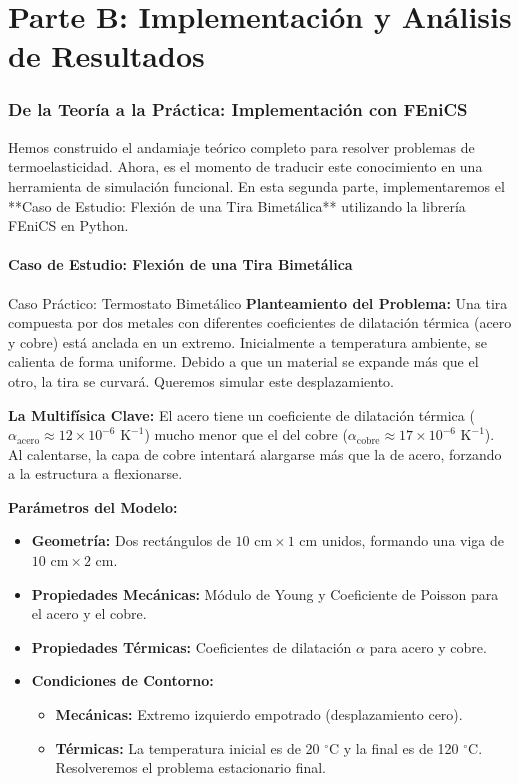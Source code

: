\part*{Parte B: Implementación y Análisis de Resultados}

\section{De la Teoría a la Práctica: Implementación con FEniCS}
Hemos construido el andamiaje teórico completo para resolver problemas de termoelasticidad. Ahora, es el momento de traducir este conocimiento en una herramienta de simulación funcional. En esta segunda parte, implementaremos el **Caso de Estudio: Flexión de una Tira Bimetálica** utilizando la librería FEniCS en Python.

\subsection{Caso de Estudio: Flexión de una Tira Bimetálica}
\begin{examplebox}{Caso Práctico: Termostato Bimetálico}
    \textbf{Planteamiento del Problema:} Una tira compuesta por dos metales con diferentes coeficientes de dilatación térmica (acero y cobre) está anclada en un extremo. Inicialmente a temperatura ambiente, se calienta de forma uniforme. Debido a que un material se expande más que el otro, la tira se curvará. Queremos simular este desplazamiento.
    
    \textbf{La Multifísica Clave:} El acero tiene un coeficiente de dilatación térmica ($\alpha_{\text{acero}} \approx 12 \times 10^{-6} \text{ K}^{-1}$) mucho menor que el del cobre ($\alpha_{\text{cobre}} \approx 17 \times 10^{-6} \text{ K}^{-1}$). Al calentarse, la capa de cobre intentará alargarse más que la de acero, forzando a la estructura a flexionarse.
    
    \textbf{Parámetros del Modelo:}
    \begin{itemize}
        \item \textbf{Geometría:} Dos rectángulos de $10 \text{ cm} \times 1 \text{ cm}$ unidos, formando una viga de $10 \text{ cm} \times 2 \text{ cm}$.
        \item \textbf{Propiedades Mecánicas:} Módulo de Young y Coeficiente de Poisson para el acero y el cobre.
        \item \textbf{Propiedades Térmicas:} Coeficientes de dilatación $\alpha$ para acero y cobre.
        \item \textbf{Condiciones de Contorno:}
             \begin{itemize}
                \item \textbf{Mecánicas:} Extremo izquierdo empotrado (desplazamiento cero).
                \item \textbf{Térmicas:} La temperatura inicial es de 20 $^{\circ}$C y la final es de 120 $^{\circ}$C. Resolveremos el problema estacionario final.
            \end{itemize}
    \end{itemize}
\end{examplebox}

